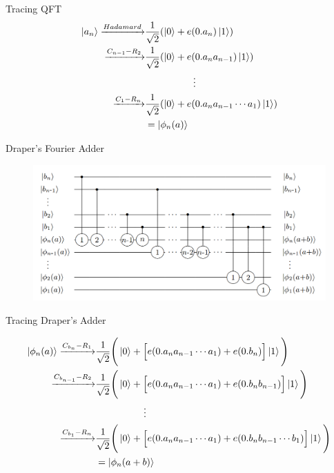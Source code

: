 \documentclass{beamer}
\begin{document}
\begin{frame}{Tracing QFT}
	\begin{align*}
		\ket{a_n}
		\xrightarrow{Hadamard}& 
		\frac{1}{\sqrt{2}} (\ket{0} + e(0.a_n) \ket{1})\\
		\xrightarrow{C_{n-1}-R_2}& 
		\frac{1}{\sqrt{2}} (\ket{0} + e(0.a_n a_{n-1}) \ket{1})\\
		&\quad\quad\quad\quad\quad\vdots\\
		\xrightarrow{C_{1}-R_n}& 
		\frac{1}{\sqrt{2}} (\ket{0} + e(0.a_n a_{n-1}\cdots a_1) \ket{1})\\
		&= \ket{\phi_n (a) }
	\end{align*}
	
\end{frame}

\begin{frame}{Draper's Fourier Adder}
	\begin{figure}[h]
		\centering
		\includegraphics[width=\linewidth]{./draper.png}
	\end{figure}
\end{frame}

\begin{frame}{Tracing Draper's Adder}
	
	\begin{align*}
		\ket{\phi_n (a)}
		\xrightarrow{C_{b_n}-R_1}& 
		\frac{1}{\sqrt{2}} \Bigg(
		\ket{0} + \Big[  e(0.a_n a_{n-1} \cdots a_1) + e(0.b_n)\Big] \ket{1}
		\Bigg)\\
		\xrightarrow{C_{b_{n-1}}-R_2}& 
		\frac{1}{\sqrt{2}} \Bigg(
		\ket{0} + \Big[  e(0.a_n a_{n-1} \cdots a_1) + e(0.b_n b_{n-1})\Big] \ket{1}
		\Bigg)\\
		&\quad\quad\quad\quad\quad\vdots\\
		\xrightarrow{C_{b_1}-R_n}& 
		\frac{1}{\sqrt{2}} \Bigg(
			\ket{0} + \Big[  e(0.a_n a_{n-1} \cdots a_1) + e(0.b_n b_{n-1} \cdots b_1)\Big] \ket{1}
		\Bigg)\\
		&= \ket{\phi_n (a+b) }
	\end{align*}

\end{frame}
\end{document}
